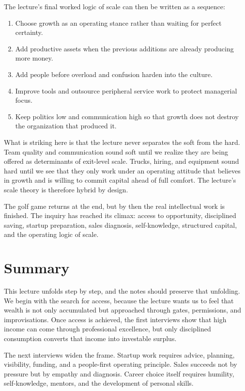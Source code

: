 The lecture's final worked logic of scale can then be written as a sequence:
\begin{enumerate}
\item Choose growth as an operating stance rather than waiting for perfect certainty.
\item Add productive assets when the previous additions are already producing more money.
\item Add people before overload and confusion harden into the culture.
\item Improve tools and outsource peripheral service work to protect managerial focus.
\item Keep politics low and communication high so that growth does not destroy the organization that produced it.
\end{enumerate}

What is striking here is that the lecture never separates the soft from the hard. Team quality and communication sound soft until we realize they are being offered as determinants of exit-level scale. Trucks, hiring, and equipment sound hard until we see that they only work under an operating attitude that believes in growth and is willing to commit capital ahead of full comfort. The lecture's scale theory is therefore hybrid by design.

The golf game returns at the end, but by then the real intellectual work is finished. The inquiry has reached its climax: access to opportunity, disciplined saving, startup preparation, sales diagnosis, self-knowledge, structured capital, and the operating logic of scale.

\section{Summary}

This lecture unfolds step by step, and the notes should preserve that unfolding. We begin with the search for access, because the lecture wants us to feel that wealth is not only accumulated but approached through gates, permissions, and improvisations. Once access is achieved, the first interviews show that high income can come through professional excellence, but only disciplined consumption converts that income into investable surplus.

The next interviews widen the frame. Startup work requires advice, planning, visibility, funding, and a people-first operating principle. Sales succeeds not by pressure but by empathy and diagnosis. Career choice itself requires humility, self-knowledge, mentors, and the development of personal skills.

